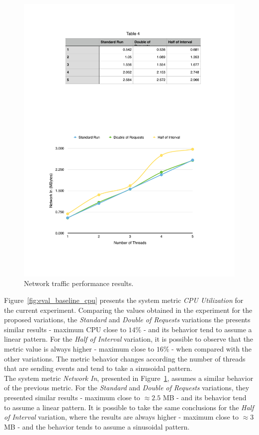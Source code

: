 \begin{figure}[ht!]
  \centering
  \includegraphics[width=.7\textwidth]{./images/network_1_lap}
  \caption{Network traffic performance results.}
  \label{fig:eval_baseline_network}
\end{figure}

Figure~\ref{fig:eval_baseline_cpu} presents the system metric \textit{CPU Utilization} for the current
experiment. Comparing the values obtained in the experiment for the proposed variations, the
\textit{Standard} and \textit{Double of Requests} variations the presents similar results -
maximum \gls{CPU} close to $14\%$ - and its behavior tend to assume a linear pattern. For the \textit{Half of Interval}
variation, it is possible to observe that the metric value is always higher - maximum close to $16\%$ -
when compared with the other variations. The metric behavior changes according the number of threads
that are sending events and tend to take a sinusoidal pattern.\\

The system metric \textit{Network In}, presented in Figure~\ref{fig:eval_baseline_network}, assumes a
similar behavior of the previous metric. For the \textit{Standard} and \textit{Double of Requests} variations,
they presented similar results - maximum close to $\approx2.5$ \gls{MB} - and its behavior tend to assume a linear
pattern. It is possible to take the same conclusions for the \textit{Half of Interval} variation,
where the results are always higher - maximum close to $\approx3$ \gls{MB} - and the behavior tends to assume
a sinusoidal pattern.

